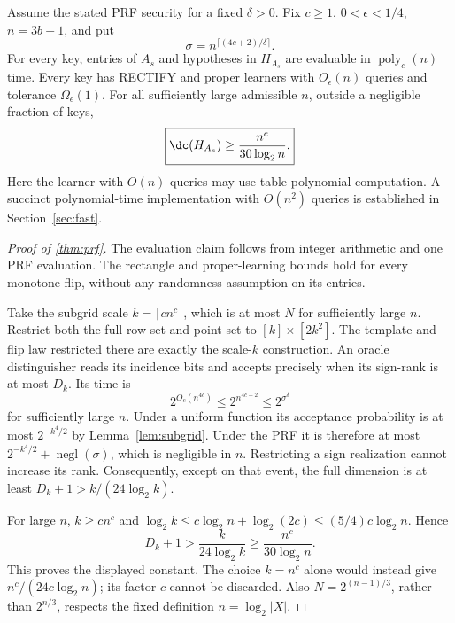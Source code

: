 \begin{theorem}\label{thm:prf}
Assume the stated PRF security for a fixed $\delta>0$. Fix $c\ge1$, $0<\epsilon<1/4$, $n=3b+1$, and put
\[
 \sigma=n^{\lceil(4c+2)/\delta\rceil}.
\]
For every key, entries of $A_s$ and hypotheses in $H_{A_s}$ are evaluable in $\operatorname{poly}_c(n)$ time. Every key has RECTIFY and proper learners with $O_\epsilon(n)$ queries and tolerance $\Omega_\epsilon(1)$. For all sufficiently large admissible $n$, outside a negligible fraction of keys,
\[
 \boxed{\dc(H_{A_s})\ge\frac{n^c}{30\log_2n}.}
\]
Here the learner with $O(n)$ queries may use table-polynomial computation. A succinct polynomial-time implementation with $O(n^2)$ queries is established in Section~\ref{sec:fast}.
\end{theorem}

\begin{proof}[Proof of \cref{thm:prf}]
The evaluation claim follows from integer arithmetic and one PRF evaluation. The rectangle and proper-learning bounds hold for every monotone flip, without any randomness assumption on its entries.

Take the subgrid scale $k=\lceil c n^c\rceil$, which is at most $N$ for sufficiently large $n$. Restrict both the full row set and point set to $[k]\times[2k^2]$. The template and flip law restricted there are exactly the scale-$k$ construction. An oracle distinguisher reads its incidence bits and accepts precisely when its sign-rank is at most $D_k$. Its time is
\[
 2^{O_c(n^{4c})}\le2^{n^{4c+2}}\le2^{\sigma^\delta}
\]
for sufficiently large $n$. Under a uniform function its acceptance probability is at most $2^{-k^4/2}$ by Lemma~\ref{lem:subgrid}. Under the PRF it is therefore at most $2^{-k^4/2}+\operatorname{negl}(\sigma)$, which is negligible in $n$. Restricting a sign realization cannot increase its rank. Consequently, except on that event, the full dimension is at least $D_k+1>k/(24\log_2k)$.

For large $n$, $k\ge c n^c$ and $\log_2k\le c\log_2n+\log_2(2c)\le(5/4)c\log_2n$. Hence
\[
 D_k+1>\frac{k}{24\log_2k}\ge\frac{n^c}{30\log_2n}.
\]
This proves the displayed constant. The choice $k=n^c$ alone would instead give $n^c/(24c\log_2n)$; its factor $c$ cannot be discarded. Also $N=2^{(n-1)/3}$, rather than $2^{n/3}$, respects the fixed definition $n=\log_2|X|$.
\end{proof}
